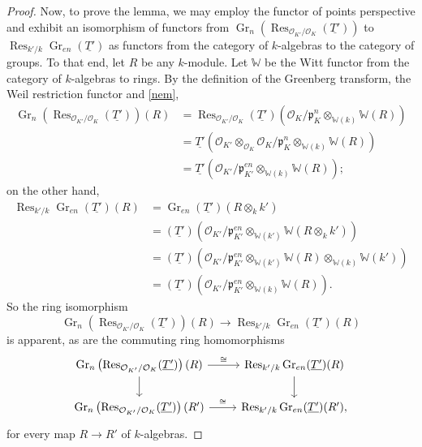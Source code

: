 \documentclass[11pt]{amsart}
\theoremstyle{plain}
\theoremstyle{definition}
\theoremstyle{remark}
\newcommand{\OK}{\mathcal{O}_K}
\newcommand{\pK}{\mathfrak{p}_K}
\newcommand{\Fq}{k}
\DeclareMathOperator{\Gr}{Gr}
\DeclareMathOperator{\Res}{Res}
\newcommand{\iso}{{\ \cong\ }}
\begin{document}
\begin{proof}
Now, to prove the lemma, we may employ the functor of points perspective 
and exhibit an isomorphism of functors from 
$\Gr_{n}\left( \Res_{\mathcal{O}_{K'}/\OK}(\underline{T'})\right)$ 
to $\Res_{k'/k} \Gr_{en}(\underline{T'})$ as functors 
from the category of $\Fq$-algebras to the category of groups.
To that end, let $R$ be any $\Fq$-module. 
Let $\mathbb{W}$ be the Witt functor from the category of $\Fq$-algebras to rings. 
By the definition of the Greenberg transform, the Weil restriction functor and \eqref{nem},
\[
\begin{aligned}
\Gr_{n}\left( \Res_{\mathcal{O}_{K'}/\OK}(\underline{T'})\right)(R)
&= \Res_{\mathcal{O}_{K'}/\OK}(\underline{T'})\left( \OK/\pK^n \otimes_{\mathbb{W}(k)} \mathbb{W}(R)\right)\\
&= \underline{T'}\left(\mathcal{O}_{K'} \otimes_{\OK} \OK/\pK^n \otimes_{\mathbb{W}(k)} \mathbb{W}(R)\right)\\
&= \underline{T'}\left(\mathcal{O}_{K'} /\mathfrak{p}_{K'}^{en} \otimes_{\mathbb{W}(k)} \mathbb{W}(R)\right);
\end{aligned}
\]
on the other hand,
\[
\begin{aligned}
\Res_{k'/k} \Gr_{en}(\underline{T'})(R)
&= \Gr_{en}(\underline{T'}) (R\otimes_{k} k')\\
&= (\underline{T'})\left( \mathcal{O}_{K'} /\mathfrak{p}_{K'}^{en} \otimes_{\mathbb{W}(k')} \mathbb{W}(R\otimes_{k} k')\right)\\
&= (\underline{T'})\left( \mathcal{O}_{K'} /\mathfrak{p}_{K'}^{en} \otimes_{\mathbb{W}(k')} \mathbb{W}(R) \otimes_{\mathbb{W}(k)} \mathbb{W}(k')\right)\\
&= (\underline{T'})\left( \mathcal{O}_{K'} /\mathfrak{p}_{K'}^{en} \otimes_{\mathbb{W}(k)} \mathbb{W}(R)\right).
\end{aligned}
\]
So the ring isomorphism 
\[
\Gr_{n}\left( \Res_{\mathcal{O}_{K'}/\OK}(\underline{T'})\right)(R) \to \Res_{k'/k} \Gr_{en}(\underline{T'})(R)
\]
is apparent, as are the commuting ring homomorphisms
\[
\begin{tikzcd}
\arrow{d} \Gr_{n}\left( \Res_{\mathcal{O}_{K'}/\OK}(\underline{T'})\right)(R) \arrow{r}{\iso} & \arrow{d} \Res_{k'/k} \Gr_{en}(\underline{T'})(R)\\
\Gr_{n}\left( \Res_{\mathcal{O}_{K'}/\OK}(\underline{T'})\right)(R') \arrow{r}{\iso} & \Res_{k'/k} \Gr_{en}(\underline{T'})(R'),
\end{tikzcd}
\]
for every map $R\to R'$ of $\Fq$-algebras.
\end{proof}
\end{document}
